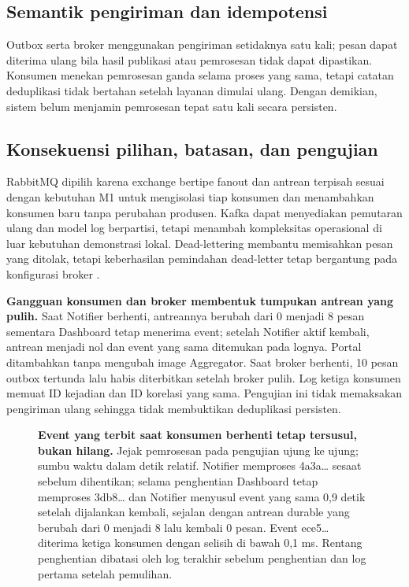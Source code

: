 \documentclass{fairmeta}
\begin{document}
\subsection{Semantik pengiriman dan idempotensi}

Outbox serta broker menggunakan pengiriman setidaknya satu kali; pesan dapat diterima ulang bila hasil publikasi atau pemrosesan tidak dapat dipastikan. Konsumen menekan pemrosesan ganda selama proses yang sama, tetapi catatan deduplikasi tidak bertahan setelah layanan dimulai ulang. Dengan demikian, sistem belum menjamin pemrosesan tepat satu kali secara persisten.

\subsection{Konsekuensi pilihan, batasan, dan pengujian}

RabbitMQ dipilih karena exchange bertipe fanout dan antrean terpisah sesuai dengan kebutuhan M1 untuk mengisolasi tiap konsumen dan menambahkan konsumen baru tanpa perubahan produsen. Kafka dapat menyediakan pemutaran ulang dan model log berpartisi, tetapi menambah kompleksitas operasional di luar kebutuhan demonstrasi lokal. Dead-lettering membantu memisahkan pesan yang ditolak, tetapi keberhasilan pemindahan dead-letter tetap bergantung pada konfigurasi broker \cite{rabbit-dlx}.

\textbf{Gangguan konsumen dan broker membentuk tumpukan antrean yang pulih.} Saat Notifier berhenti, antreannya berubah dari 0 menjadi 8 pesan sementara Dashboard tetap menerima event; setelah Notifier aktif kembali, antrean menjadi nol dan event yang sama ditemukan pada lognya. Portal ditambahkan tanpa mengubah image Aggregator. Saat broker berhenti, 10 pesan outbox tertunda lalu habis diterbitkan setelah broker pulih. Log ketiga konsumen memuat ID kejadian dan ID korelasi yang sama. Pengujian ini tidak memaksakan pengiriman ulang sehingga tidak membuktikan deduplikasi persisten.

\begin{figure}[htbp]
\centering

\caption[Jejak penyampaian event ke tiga konsumen]{\textbf{Event yang terbit saat konsumen berhenti tetap tersusul, bukan hilang.} Jejak pemrosesan pada pengujian ujung ke ujung; sumbu waktu dalam detik relatif. Notifier memproses 4a3a\ldots{} sesaat sebelum dihentikan; selama penghentian Dashboard tetap memproses 3db8\ldots{} dan Notifier menyusul event yang sama 0,9 detik setelah dijalankan kembali, sejalan dengan antrean durable yang berubah dari 0 menjadi 8 lalu kembali 0 pesan. Event ece5\ldots{} diterima ketiga konsumen dengan selisih di bawah 0,1 ms. Rentang penghentian dibatasi oleh log terakhir sebelum penghentian dan log pertama setelah pemulihan.}
\label{fig:p5-delivery}
\end{figure}
\end{document}
